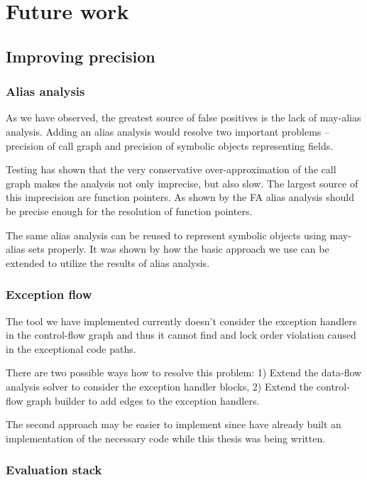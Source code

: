 \chapter{Future work}

\section{Improving precision}

\subsection{Alias analysis}

As we have observed, the greatest source of false positives is the lack of may-alias analysis. Adding an alias analysis would resolve two important problems -- precision of call graph and precision of symbolic objects representing fields.

Testing has shown that the very conservative over-approximation of the call graph makes the analysis not only imprecise, but also slow. The largest source of this imprecision are function pointers. As shown by \citet{Milanova2002} the FA alias analysis should be precise enough for the resolution of function pointers. 

The same alias analysis can be reused to represent symbolic objects using may-alias sets properly. It was shown by \citet{Deshmukh2009} how the basic approach we use can be extended to utilize the results of alias analysis. 

\subsection{Exception flow}

The tool we have implemented currently doesn't consider the exception handlers in the control-flow graph and thus it cannot find and lock order violation caused in the exceptional code paths.

There are two possible ways how to resolve this problem: 1) Extend the data-flow analysis solver to consider the exception handler blocks, 2) Extend the control-flow graph builder to add edges to the exception handlers.

The second approach may be easier to implement since \citet{ILSpy} have already built an implementation of the necessary code while this thesis was being written. 

\subsection{Evaluation stack}

